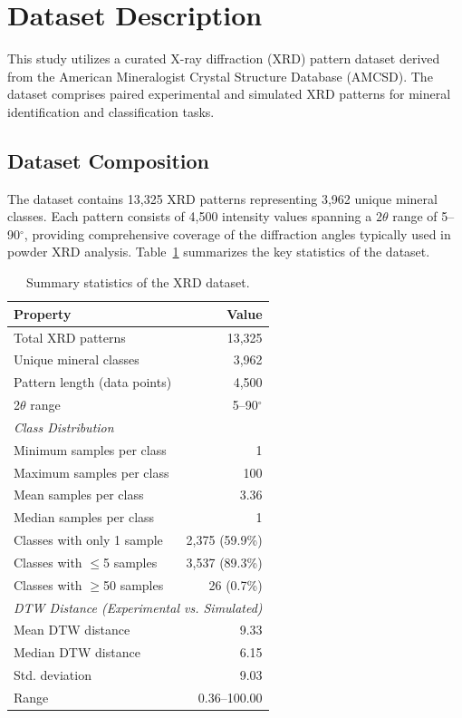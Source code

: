 \section{Dataset Description}
\label{sec:dataset}

This study utilizes a curated X-ray diffraction (XRD) pattern dataset derived from the American Mineralogist Crystal Structure Database (AMCSD). The dataset comprises paired experimental and simulated XRD patterns for mineral identification and classification tasks.

\subsection{Dataset Composition}

The dataset contains 13,325 XRD patterns representing 3,962 unique mineral classes. Each pattern consists of 4,500 intensity values spanning a $2\theta$ range of 5--90$^\circ$, providing comprehensive coverage of the diffraction angles typically used in powder XRD analysis. Table~\ref{tab:dataset_stats} summarizes the key statistics of the dataset.


\begin{table}[htbp]
\centering
\caption{Summary statistics of the XRD dataset.}
\label{tab:dataset_stats}
\begin{tabular}{lr}
\toprule
\textbf{Property} & \textbf{Value} \\
\midrule
Total XRD patterns & 13,325 \\
Unique mineral classes & 3,962 \\
Pattern length (data points) & 4,500 \\
2$\theta$ range & 5--90$^\circ$ \\
\midrule
\multicolumn{2}{l}{\textit{Class Distribution}} \\
\midrule
Minimum samples per class & 1 \\
Maximum samples per class & 100 \\
Mean samples per class & 3.36 \\
Median samples per class & 1 \\
Classes with only 1 sample & 2,375 (59.9\%) \\
Classes with $\leq$5 samples & 3,537 (89.3\%) \\
Classes with $\geq$50 samples & 26 (0.7\%) \\
\midrule
\multicolumn{2}{l}{\textit{DTW Distance (Experimental vs. Simulated)}} \\
\midrule
Mean DTW distance & 9.33 \\
Median DTW distance & 6.15 \\
Std. deviation & 9.03 \\
Range & 0.36--100.00 \\
\bottomrule
\end{tabular}
\end{table}


